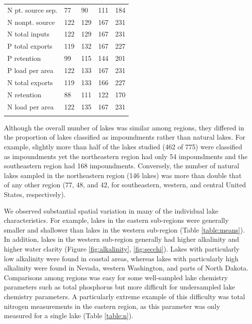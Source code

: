 \documentclass[journal abbreviations, manuscript]{copernicus}
\begin{document}
\begin{table}
\begin{tabular}{lllll}
N pt. source sep. & 77 & 90 & 111 & 184\\

N nonpt. source & 122 & 129 & 167 & 231\\

N total inputs & 122 & 129 & 167 & 231\\

P total exports & 119 & 132 & 167 & 227\\

P retention & 99 & 115 & 144 & 201\\

P load per area & 122 & 133 & 167 & 231\\

N total exports & 119 & 133 & 166 & 227\\

N retention & 88 & 111 & 122 & 170\\

N load per area & 122 & 135 & 167 & 231\\
\bottomhline
\end{tabular}
\end{table}

%
%

Although the overall number of lakes was similar among regions, they differed in the proportion of lakes classified as impoundments rather than natural lakes. For example, slightly more than half of the lakes studied (462 of 775) were classified as impoundments yet the northeastern region had only 54 impoundments and the southeastern region had 168 impoundments. Conversely, the number of natural lakes sampled in the northeastern region (146 lakes) was more than double that of any other region (77, 48, and 42, for southeastern, western, and central United States, respectively).

We observed substantial spatial variation in many of the individual lake characteristics. For example, lakes in the eastern sub-regions were generally smaller and shallower than lakes in the western sub-region (Table \ref{table:means}). In addition, lakes in the western sub-region generally had higher alkalinity and higher water clarity (Figure \ref{fig:alkalinity}, \ref{fig:secchi}). Lakes with particularly low alkalinity were found in coastal areas, whereas lakes with particularly high alkalinity were found in Nevada, western Washington, and parts of North Dakota. Comparisons among regions was easy for some well-sampled lake chemistry parameters such as total phosphorus but more difficult for undersampled lake chemistry parameters. A particularly extreme example of this difficulty was total nitrogen measurements in the eastern region, as this parameter was only measured for a single lake (Table \ref{table:n}). 
\end{document}
